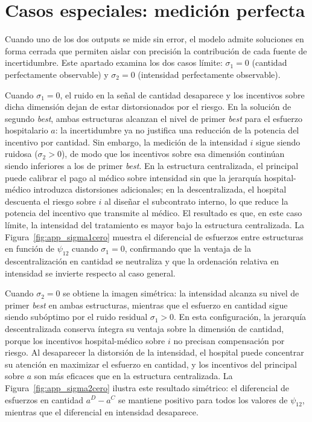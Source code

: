 \documentclass[12pt, a4paper, twoside, openright]{book}
\theoremstyle{plain}
\theoremstyle{definition}
\theoremstyle{remark}
\begin{document}
\section{Casos especiales: medición perfecta}

Cuando uno de los dos outputs se mide sin error, el modelo admite soluciones en forma cerrada que permiten aislar con precisión la contribución de cada fuente de incertidumbre. Este apartado examina los dos casos límite: $\sigma_1=0$ (cantidad perfectamente observable) y $\sigma_2=0$ (intensidad perfectamente observable).

Cuando $\sigma_1=0$, el ruido en la señal de cantidad desaparece y los incentivos sobre dicha dimensión dejan de estar distorsionados por el riesgo. En la solución de segundo \textit{best}, ambas estructuras alcanzan el nivel de primer \textit{best} para el esfuerzo hospitalario $a$: la incertidumbre ya no justifica una reducción de la potencia del incentivo por cantidad. Sin embargo, la medición de la intensidad $i$ sigue siendo ruidosa ($\sigma_2>0$), de modo que los incentivos sobre esa dimensión continúan siendo inferiores a los de primer \textit{best}. En la estructura centralizada, el principal puede calibrar el pago al médico sobre intensidad sin que la jerarquía hospital-médico introduzca distorsiones adicionales; en la descentralizada, el hospital descuenta el riesgo sobre $i$ al diseñar el subcontrato interno, lo que reduce la potencia del incentivo que transmite al médico. El resultado es que, en este caso límite, la intensidad del tratamiento es mayor bajo la estructura centralizada. La Figura~\ref{fig:app_sigma1cero} muestra el diferencial de esfuerzos entre estructuras en función de $\psi_{12}$ cuando $\sigma_1=0$, confirmando que la ventaja de la descentralización en cantidad se neutraliza y que la ordenación relativa en intensidad se invierte respecto al caso general.

Cuando $\sigma_2=0$ se obtiene la imagen simétrica: la intensidad alcanza su nivel de primer \textit{best} en ambas estructuras, mientras que el esfuerzo en cantidad sigue siendo subóptimo por el ruido residual $\sigma_1>0$. En esta configuración, la jerarquía descentralizada conserva íntegra su ventaja sobre la dimensión de cantidad, porque los incentivos hospital-médico sobre $i$ no precisan compensación por riesgo. Al desaparecer la distorsión de la intensidad, el hospital puede concentrar su atención en maximizar el esfuerzo en cantidad, y los incentivos del principal sobre $a$ son más eficaces que en la estructura centralizada. La Figura~\ref{fig:app_sigma2cero} ilustra este resultado simétrico: el diferencial de esfuerzos en cantidad $a^D - a^C$ se mantiene positivo para todos los valores de $\psi_{12}$, mientras que el diferencial en intensidad desaparece.
\end{document}
